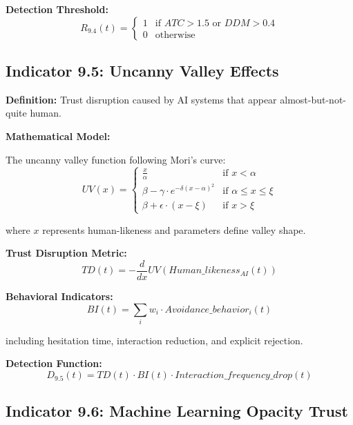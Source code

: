 \documentclass[11pt,a4paper]{article}
\begin{document}
\textbf{Detection Threshold:}
\begin{equation}
R_{9.4}(t) = \begin{cases}
1 & \text{if } ATC > 1.5 \text{ or } DDM > 0.4 \\
0 & \text{otherwise}
\end{cases}
\end{equation}

\subsection{Indicator 9.5: Uncanny Valley Effects}

\textbf{Definition:} Trust disruption caused by AI systems that appear almost-but-not-quite human.

\textbf{Mathematical Model:}

The uncanny valley function following Mori's curve:
\begin{equation}
UV(x) = \begin{cases}
\frac{x}{\alpha} & \text{if } x < \alpha \\
\beta - \gamma \cdot e^{-\delta(x-\alpha)^2} & \text{if } \alpha \leq x \leq \xi \\
\beta + \epsilon \cdot (x - \xi) & \text{if } x > \xi
\end{cases}
\end{equation}

where $x$ represents human-likeness and parameters define valley shape.

\textbf{Trust Disruption Metric:}
\begin{equation}
TD(t) = -\frac{d}{dx}UV(Human\_likeness_{AI}(t))
\end{equation}

\textbf{Behavioral Indicators:}
\begin{equation}
BI(t) = \sum_{i} w_i \cdot Avoidance\_behavior_i(t)
\end{equation}

including hesitation time, interaction reduction, and explicit rejection.

\textbf{Detection Function:}
\begin{equation}
D_{9.5}(t) = TD(t) \cdot BI(t) \cdot Interaction\_frequency\_drop(t)
\end{equation}

\subsection{Indicator 9.6: Machine Learning Opacity Trust}
\end{document}
